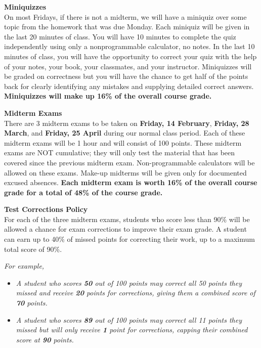 \documentclass[11pt]{article}
\renewcommand{\emph}[1]{\textsf{\textbf{#1}}}
\newcommand{\localhead}[1]{\par\smallskip\textbf{#1} \smallskip\nobreak\\}%
\def\heading#1{\localhead{\large\emph{#1}}}
\def\subheading#1{\localhead{\emph{#1}}}
\begin{document}
\heading{Miniquizzes}
On most {Fridays}, if there is not a midterm, we will have a miniquiz over some topic from the homework that was due Monday. Each miniquiz will be given in the last 20 minutes of class. You will have 10 minutes to complete the quiz independently using only a nonprogrammable calculator, no notes. In the last 10 minutes of class, you will have the opportunity to correct your quiz with the help of your notes, your book, your classmates, and your instructor. Miniquizzes will be graded on correctness but you will have the chance to get half of the points back for clearly identifying any mistakes and supplying detailed correct answers. {\bf Miniquizzes will make up 16\% of the overall course
grade.}


\heading{Midterm Exams}
There are 3 midterm exams to be taken on {\bf Friday, 14 February},
{\bf Friday, 28 March}, and {\bf Friday, 25 April} during our normal class period. Each of
these midterm exams will be 1 hour and will consist of 100 points. These midterm exams are
NOT cumulative; they will only test the material that has been covered since the previous
midterm exam. Non-programmable calculators will be allowed on these exams. Make-up
midterms will be given only for documented excused absences.
{\bf Each midterm exam is worth 16\% of the overall course grade for a total of 48\% of the course grade.}


\subheading{Test Corrections Policy}
For each of the three midterm exams, students who score less than 90\% will be allowed a
chance for exam corrections to improve their exam grade. A student can earn up to 40\% of missed points for correcting their work, up to a maximum total score of 90\%.

\newpage

{\it For example,
\begin{itemize}
\item {\it A student who scores {\bf 50} out of 100 points may
correct all 50 points they missed and receive {\bf 20} points for
corrections, giving them a combined score of {\bf 70} points.}
\item {\it A student who scores {\bf 89} out of 100 points may
correct all 11 points they missed but will only receive {\bf 1} point
for
corrections, capping their combined score at {\bf 90} points.}
\end{itemize}
}
\end{document}
